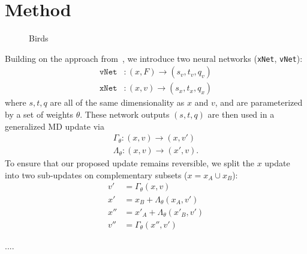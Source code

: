 \documentclass[a4paper,11pt]{article}
\begin{document}
\section{\label{sec:method}Method}
%
\begin{wrapfigure}{r}{0.5\textwidth}
  \begin{center}
    
  \end{center}
  \caption{Birds}
\end{wrapfigure}
%
Building on the approach from~\cite{L2HMC,FTHMC,etc}, we introduce two neural networks (\texttt{xNet}, \texttt{vNet}):
%
\begin{align}
\texttt{vNet}&: (x, F) \rightarrow (s_{v}, t_{v}, q_{v}) \\
\texttt{xNet}&: (x, v) \rightarrow (s_{x}, t_{x}, q_{x})
\end{align}
%
where $s, t, q$ are all of the same dimensionality as $x$ and $v$, and are parameterized by a set of weights $\theta$.
%
These network outputs $(s, t, q)$ are then used in a generalized MD update via
%
\begin{align}
\Gamma_{\theta}: (x, v) \rightarrow (x, v') \\
\Lambda_{\theta}: (x, v) \rightarrow (x', v).
\end{align}
%
To ensure that our proposed update remains reversible, we split the $x$ update into two sub-updates on complementary subsets ($x = x_{A} \cup x_{B}$):
%
\begin{align}
v' &= \Gamma_{\theta}(x, v) \\
x' &= x_{B} + \Lambda_{\theta}(x_{A}, v') \\
x'' &= x'_{A} + \Lambda_{\theta}(x'_{B}, v') \\
v'' &= \Gamma_{\theta}(x'', v')
\end{align}



\begin{thebibliography}{99}
....

\end{thebibliography}
\end{document}
